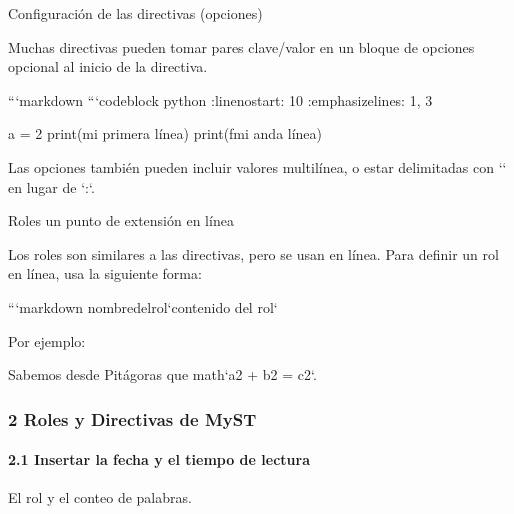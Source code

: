 \documentclass[a4paper,10pt,spanish]{sphinxmanual}
\begin{document}
\begin{sphinxVerbatim}[commandchars=\\\{\}]

\PYGZsh{}\PYGZsh{}\PYGZsh{}\PYGZsh{} Configuración de las directivas (opciones)

Muchas directivas pueden tomar pares clave/valor en un bloque de opciones opcional al inicio de la directiva.

```markdown
```\PYGZob{}code\PYGZhy{}block\PYGZcb{} python
:lineno\PYGZhy{}start: 10
:emphasize\PYGZhy{}lines: 1, 3

a = 2
print(\PYGZsq{}mi primera línea\PYGZsq{})
print(f\PYGZsq{}mi \PYGZob{}a\PYGZcb{}nda línea\PYGZsq{})
\end{sphinxVerbatim}

\begin{sphinxVerbatim}[commandchars=\\\{\}]

Las opciones también pueden incluir valores multilínea, o estar delimitadas con `\PYGZhy{}\PYGZhy{}\PYGZhy{}` en lugar de `:`.

\PYGZsh{}\PYGZsh{}\PYGZsh{} Roles \PYGZhy{} un punto de extensión en línea

Los roles son similares a las directivas, pero se usan en línea.
Para definir un rol en línea, usa la siguiente forma:

```markdown
\PYGZob{}nombre\PYGZhy{}del\PYGZhy{}rol\PYGZcb{}`contenido del rol`
\end{sphinxVerbatim}

\sphinxAtStartPar
Por ejemplo:

\begin{sphinxVerbatim}[commandchars=\\\{\}]
Sabemos desde Pitágoras que \PYGZob{}math\PYGZcb{}`a\PYGZca{}2 + b\PYGZca{}2 = c\PYGZca{}2`.
\end{sphinxVerbatim}


\subsubsection{2 Roles y Directivas de MyST}
\label{\detokenize{configuracion_inicial/013.guia_de_myst_parser:roles-y-directivas-de-myst}}

\paragraph{2.1 Insertar la fecha y el tiempo de lectura}
\label{\detokenize{configuracion_inicial/013.guia_de_myst_parser:insertar-la-fecha-y-el-tiempo-de-lectura}}
\sphinxAtStartPar
{}El rol  y el conteo de palabras.
\end{document}
